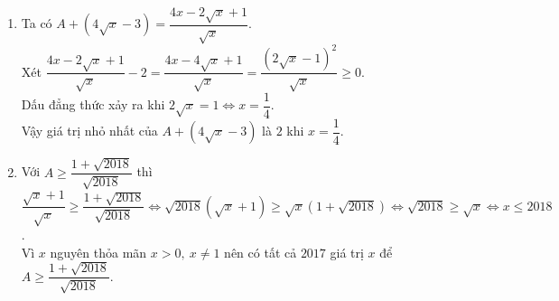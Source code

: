 \begin{bt}
{\begin{enumerate}
			\item Ta có $ A+( 4\sqrt{x}-3)=\dfrac{4x-2\sqrt{x}+1}{\sqrt{x}} $.\\
			Xét $ \dfrac{4x-2\sqrt{x}+1}{\sqrt{x}}-2=\dfrac{4x-4\sqrt{x}+1}{\sqrt{x}}=\dfrac{(2\sqrt{x}-1)^{2}}{\sqrt{x}}\geq 0 $.\\
			Dấu đẳng thức xảy ra khi $ 2\sqrt{x}=1\Leftrightarrow x=\dfrac{1}{4} $.\\
			Vậy giá trị nhỏ nhất của $ A+( 4\sqrt{x}-3) $ là $ 2 $ khi $ x=\dfrac{1}{4} $.
			\item Với $A\ge \dfrac{1+ \sqrt{2018}}{\sqrt{2018}}$ thì\\
			$\dfrac{\sqrt x +1}{\sqrt x} \ge \dfrac{1+ \sqrt{2018}}{\sqrt{2018}} \Leftrightarrow \sqrt{2018}(\sqrt x +1) \ge \sqrt x (1+ \sqrt{2018}) \Leftrightarrow \sqrt {2018}\ge \sqrt x\Leftrightarrow x \le 2018$.\\
			Vì $x$ nguyên thỏa mãn $ x>0,\ x\neq 1 $ nên có tất cả $2017$ giá trị $x$ để $A\ge \dfrac{1+ \sqrt{2018}}{\sqrt{2018}}.$
	\end{enumerate}} 
\end{bt}

